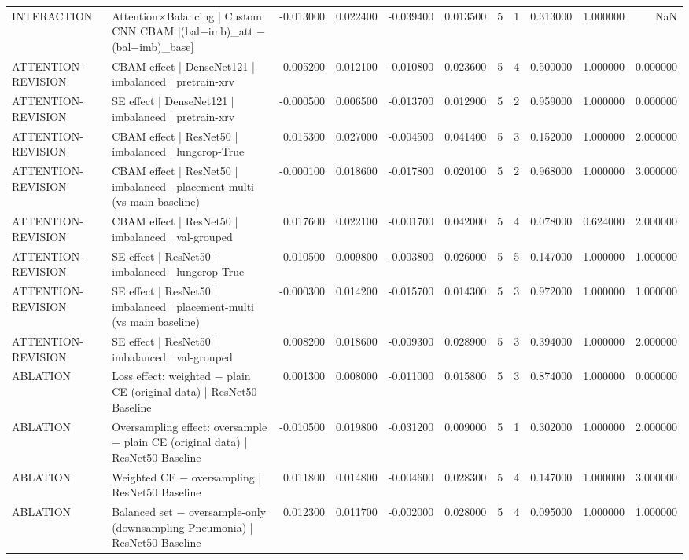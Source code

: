 \begin{tabular}{llrrrrrrrrr}
INTERACTION & Attention×Balancing | Custom CNN CBAM  [(bal−imb)\_att − (bal−imb)\_base] & -0.013000 & 0.022400 & -0.039400 & 0.013500 & 5 & 1 & 0.313000 & 1.000000 & NaN \\
ATTENTION-REVISION & CBAM effect | DenseNet121 | imbalanced | pretrain-xrv & 0.005200 & 0.012100 & -0.010800 & 0.023600 & 5 & 4 & 0.500000 & 1.000000 & 0.000000 \\
ATTENTION-REVISION & SE effect | DenseNet121 | imbalanced | pretrain-xrv & -0.000500 & 0.006500 & -0.013700 & 0.012900 & 5 & 2 & 0.959000 & 1.000000 & 0.000000 \\
ATTENTION-REVISION & CBAM effect | ResNet50 | imbalanced | lungcrop-True & 0.015300 & 0.027000 & -0.004500 & 0.041400 & 5 & 3 & 0.152000 & 1.000000 & 2.000000 \\
ATTENTION-REVISION & CBAM effect | ResNet50 | imbalanced | placement-multi (vs main baseline) & -0.000100 & 0.018600 & -0.017800 & 0.020100 & 5 & 2 & 0.968000 & 1.000000 & 3.000000 \\
ATTENTION-REVISION & CBAM effect | ResNet50 | imbalanced | val-grouped & 0.017600 & 0.022100 & -0.001700 & 0.042000 & 5 & 4 & 0.078000 & 0.624000 & 2.000000 \\
ATTENTION-REVISION & SE effect | ResNet50 | imbalanced | lungcrop-True & 0.010500 & 0.009800 & -0.003800 & 0.026000 & 5 & 5 & 0.147000 & 1.000000 & 1.000000 \\
ATTENTION-REVISION & SE effect | ResNet50 | imbalanced | placement-multi (vs main baseline) & -0.000300 & 0.014200 & -0.015700 & 0.014300 & 5 & 3 & 0.972000 & 1.000000 & 1.000000 \\
ATTENTION-REVISION & SE effect | ResNet50 | imbalanced | val-grouped & 0.008200 & 0.018600 & -0.009300 & 0.028900 & 5 & 3 & 0.394000 & 1.000000 & 2.000000 \\
ABLATION & Loss effect: weighted − plain CE (original data) | ResNet50 Baseline & 0.001300 & 0.008000 & -0.011000 & 0.015800 & 5 & 3 & 0.874000 & 1.000000 & 0.000000 \\
ABLATION & Oversampling effect: oversample − plain CE (original data) | ResNet50 Baseline & -0.010500 & 0.019800 & -0.031200 & 0.009000 & 5 & 1 & 0.302000 & 1.000000 & 2.000000 \\
ABLATION & Weighted CE − oversampling | ResNet50 Baseline & 0.011800 & 0.014800 & -0.004600 & 0.028300 & 5 & 4 & 0.147000 & 1.000000 & 3.000000 \\
ABLATION & Balanced set − oversample-only (downsampling Pneumonia) | ResNet50 Baseline & 0.012300 & 0.011700 & -0.002000 & 0.028000 & 5 & 4 & 0.095000 & 1.000000 & 1.000000 \\

\end{tabular}
